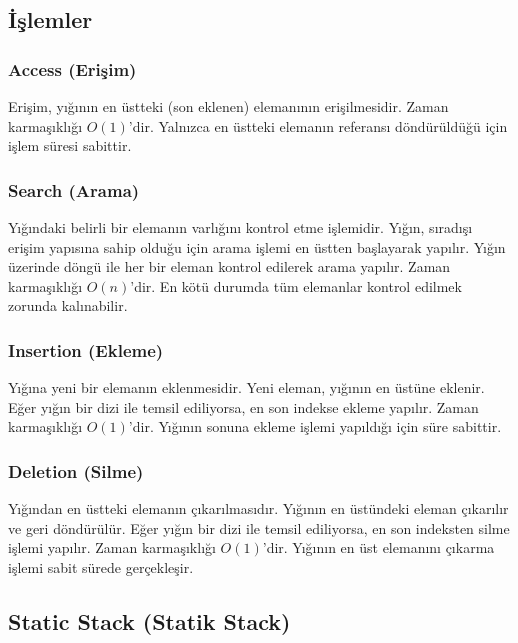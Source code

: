 \subsection{İşlemler}

\subsubsection{Access (Erişim)}

Erişim, yığının en üstteki (son eklenen) elemanının erişilmesidir. Zaman karmaşıklığı $O(1)$'dir. Yalnızca en üstteki elemanın referansı döndürüldüğü için işlem süresi sabittir.

\subsubsection{Search (Arama)}

Yığındaki belirli bir elemanın varlığını kontrol etme işlemidir. Yığın, sıradışı erişim yapısına sahip olduğu için arama işlemi en üstten başlayarak yapılır. Yığın üzerinde döngü ile her bir eleman kontrol edilerek arama yapılır. Zaman karmaşıklığı $O(n)$'dir. En kötü durumda tüm elemanlar kontrol edilmek zorunda kalınabilir.

\subsubsection{Insertion (Ekleme)}

Yığına yeni bir elemanın eklenmesidir. Yeni eleman, yığının en üstüne eklenir. Eğer yığın bir dizi ile temsil ediliyorsa, en son indekse ekleme yapılır. Zaman karmaşıklığı $O(1)$'dir. Yığının sonuna ekleme işlemi yapıldığı için süre sabittir. 

\subsubsection{Deletion (Silme)}

Yığından en üstteki elemanın çıkarılmasıdır. Yığının en üstündeki eleman çıkarılır ve geri döndürülür. Eğer yığın bir dizi ile temsil ediliyorsa, en son indeksten silme işlemi yapılır. Zaman karmaşıklığı $O(1)$'dir. Yığının en üst elemanını çıkarma işlemi sabit sürede gerçekleşir.

\newpage

\subsection{Static Stack (Statik Stack)}

